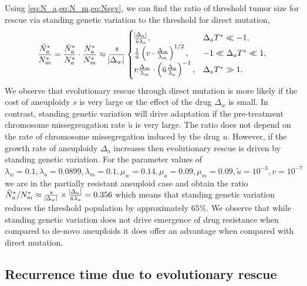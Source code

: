 \documentclass[12pt]{extarticle}
\begin{document}
Using \cref{eq:N_a,eq:N_m,eq:Nsgv}, we can find the ratio of threshold tumor size for rescue via standing genetic variation  to the threshold for direct mutation,
\begin{equation} \label{eq:N_sgv_ratio}
\frac{\tilde{N}^*_a}{N^*_m}=\frac{\tilde{N}^*_{a}}{N^*_{a}} \cdot \frac{N^*_a}{N^*_m} \approx \frac{s}{\abs{\Delta_w}}\begin{cases}
    \frac{\abs{\Delta_a}}{\tilde{u}\lambda_a} ,&
  \Delta_a T^* \ll -1 ,\\ 
  \frac{1}{\tilde{u}}\left(v \cdot \frac{\Delta_m}{\lambda_m}\right)^{1/2} ,&
  -1 \ll \Delta_a T^* \ll 1  ,\\ 
  v \frac{\Delta_m}{\lambda_m} \cdot \left(\tilde{u}\frac{\Delta_a}{\lambda_a}\right)^{-1}  ,&
   \Delta_a T^* \gg 1 .
  \end{cases}
\end{equation}
We observe that evolutionary rescue through direct mutation is more likely if the cost of aneuploidy $s$ is very large or the effect of the drug $\Delta_w$ is small.  In contrast, standing genetic variation will drive adaptation if the pre-treatment chromosome missegreagation rate $\tilde{u}$ is very large. The ratio does not depend on the rate of chromosome missegregation induced by the drug $u$. However, if the growth rate of aneuploidy $\Delta_a$ increases then evolutionary rescue is driven by standing genetic variation. For the parameter values of  $\lambda_w=0.1, \lambda_a=0.0899,\lambda_m=0.1,\mu_w=0.14,\mu_a=0.09,\mu_m=0.09, \tilde{u}=10^{-3}, v=10^{-7}$ we are in the partially resistant aneuploid case and obtain the ratio $\tilde{N}^*_a/N^*_m\approx\frac{s}{\abs{\Delta_w}}\times\frac{\abs{\Delta_a}}{\tilde{u}\lambda_a}=0.356$ which means that standing genetic variation reduces the threshold population by approximately $65\%$. We observe that while standing genetic variation does not drive emergence of drug resistance when compared to de-novo aneuploids it does offer an advantage when compared with direct mutation.


\subsection*{Recurrence time due to evolutionary rescue}
\end{document}
